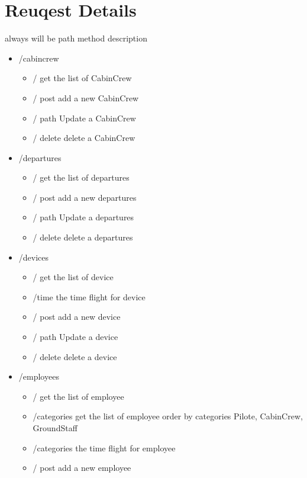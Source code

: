 \documentclass{article}
\begin{document}
    \section{Reuqest Details}
    always will be path method description
    \begin{itemize}
        \item /cabincrew 
                \begin{itemize}
                    \item / get the list of CabinCrew
                    \item / post add a new CabinCrew  
                    \item / path Update a CabinCrew
                    \item / delete delete a CabinCrew
                \end{itemize}
        \item /departures
            \begin{itemize}
                \item / get the list of departures
                \item / post add a new departures  
                \item / path Update a departures
                \item / delete delete a departures
            \end{itemize}
        \item /devices
            \begin{itemize}
                \item / get the list of device
                \item /time the time flight for device
                \item / post add a new device  
                \item / path Update a device
                \item / delete delete a device
            \end{itemize}
        \item /employees
            \begin{itemize}
                \item / get the list of employee
                \item /categories get the list of employee order by categories Pilote, CabinCrew, GroundStaff
                \item /categories the time flight for employee
                \item / post add a new employee  

\end{itemize}
\end{itemize}
\end{document}
